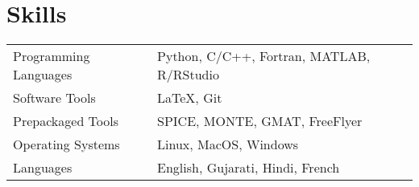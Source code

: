 \documentclass[letterpaper,12pt]{article}
\begin{document}
\section{Skills}
\begin{tabularx}{\linewidth}{@{}l X@{}}
Programming Languages  &  Python, C/C++, Fortran, MATLAB, R/RStudio \\[3.75pt]
Software Tools         &  \LaTeX, Git                               \\[3.75pt]
Prepackaged Tools      &  SPICE, MONTE, GMAT, FreeFlyer             \\[3.75pt]
Operating Systems      &  Linux, MacOS, Windows                     \\[3.75pt]
Languages              &  English, Gujarati, Hindi, French          \\[3.75pt]
\end{tabularx}

\end{document}
